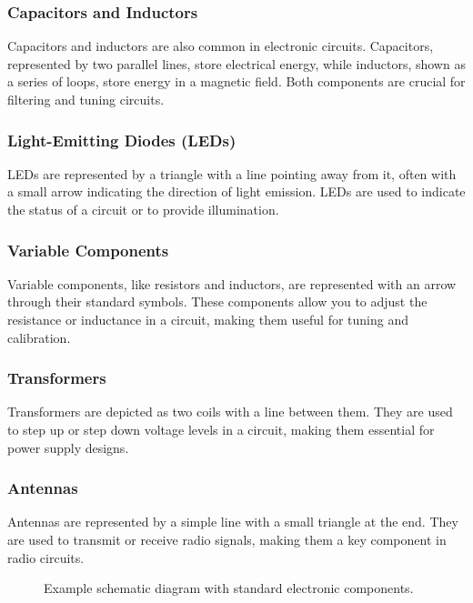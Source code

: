 \subsubsection*{Capacitors and Inductors}
Capacitors and inductors are also common in electronic circuits. Capacitors, represented by two parallel lines, store electrical energy, while inductors, shown as a series of loops, store energy in a magnetic field. Both components are crucial for filtering and tuning circuits.

\subsubsection*{Light-Emitting Diodes (LEDs)}
LEDs are represented by a triangle with a line pointing away from it, often with a small arrow indicating the direction of light emission. LEDs are used to indicate the status of a circuit or to provide illumination.

\subsubsection*{Variable Components}
Variable components, like resistors and inductors, are represented with an arrow through their standard symbols. These components allow you to adjust the resistance or inductance in a circuit, making them useful for tuning and calibration.

\subsubsection*{Transformers}
Transformers are depicted as two coils with a line between them. They are used to step up or step down voltage levels in a circuit, making them essential for power supply designs.

\subsubsection*{Antennas}
Antennas are represented by a simple line with a small triangle at the end. They are used to transmit or receive radio signals, making them a key component in radio circuits.

\begin{figure}[h]
    \centering
    \caption{Example schematic diagram with standard electronic components.}
    \label{fig:schematic-example}
\end{figure}

